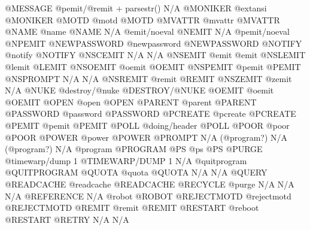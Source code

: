 \documentclass[letterpaper,10pt,english]{sphinxmanual}
\begin{document}
\begin{description}
@MESSAGE                @pemit/@remit + parsestr()     N/A
@MONIKER                @extansi                       @MONIKER
@MOTD                   @motd                          @MOTD
@MVATTR                 @mvattr                        @MVATTR
@NAME                   @name                          @NAME
N/A                     @emit/noeval                   @NEMIT
N/A                     @pemit/noeval                  @NPEMIT
@NEWPASSWORD            @newpassword                   @NEWPASSWORD
@NOTIFY                 @notify                        @NOTIFY
@NSCEMIT                N/A                            N/A
@NSEMIT                 @emit                          @emit
@NSLEMIT                @lemit                         @LEMIT
@NSOEMIT                @oemit                         @OEMIT
@NSPEMIT                @pemit                         @PEMIT
@NSPROMPT               N/A                            N/A
@NSREMIT                @remit                         @REMIT
@NSZEMIT                @zemit                         N/A
@NUKE                   @destroy/@nuke                 @DESTROY/@NUKE
@OEMIT                  @oemit                         @OEMIT
@OPEN                   @open                          @OPEN
@PARENT                 @parent                        @PARENT
@PASSWORD               @password                      @PASSWORD
@PCREATE                @pcreate                       @PCREATE
@PEMIT                  @pemit                         @PEMIT
@POLL                   @doing/header                  @POLL
@POOR                   @poor                          @POOR
@POWER                  @power                         @POWER
@PROMPT                 N/A (@program?)                N/A (@program?)
N/A                     @program                       @PROGRAM
@PS                     @ps                            @PS
@PURGE                  @timewarp/dump 1               @TIMEWARP/DUMP 1
N/A                     @quitprogram                   @QUITPROGRAM
@QUOTA                  @quota                         @QUOTA
N/A                     N/A                            @QUERY
@READCACHE              @readcache                     @READCACHE
@RECYCLE                @purge                         N/A
N/A                     N/A                            @REFERENCE
N/A                     @robot                         @ROBOT
@REJECTMOTD             @rejectmotd                    @REJECTMOTD
@REMIT                  @remit                         @REMIT
@RESTART                @reboot                        @RESTART
@RETRY                  N/A                            N/A

\end{description}
\end{document}
